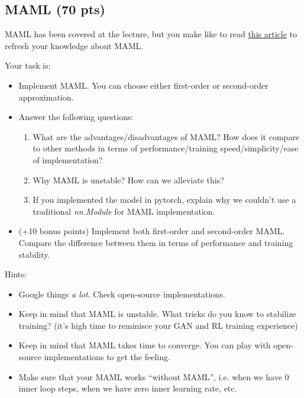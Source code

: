 \documentclass[letterpaper,12pt]{article}
\begin{document}
\subsection{MAML (70 pts)}
MAML has been covered at the lecture, but you make like to read \href{https://www.bayeswatch.com/2018/11/30/HTYM/}{this article} to refresh your knowledge about MAML.

Your task is:
\begin{itemize}
    \item Implement MAML. You can choose either first-order or second-order approximation.
    \item Answer the following questions:
    \begin{enumerate}
        \item What are the advantages/disadvantages of MAML? How does it compare to other methods in terms of performance/training speed/simplicity/ease of implementation?
        \item Why MAML is unstable? How can we alleviate this?
        \item If you implemented the model in pytorch, explain why we couldn't use a traditional \textit{nn.Module} for MAML implementation.
    \end{enumerate}
    \item (+10 bonus points) Implement both first-order and second-order MAML. Compare the difference between them in terms of performance and training stability.
\end{itemize}

Hints:
\begin{itemize}
    \item Google things \textit{a lot}. Check open-source implementations.
    \item Keep in mind that MAML is unstable. What tricks do you know to stabilize training? (it's high time to reminisce your GAN and RL training experience)
    \item Keep in mind that MAML takes time to converge. You can play with open-source implementations to get the feeling.
    \item Make sure that your MAML works ``without MAML'', i.e. when we have 0 inner loop steps, when we have zero inner learning rate, etc.
\end{itemize}

\end{document}
